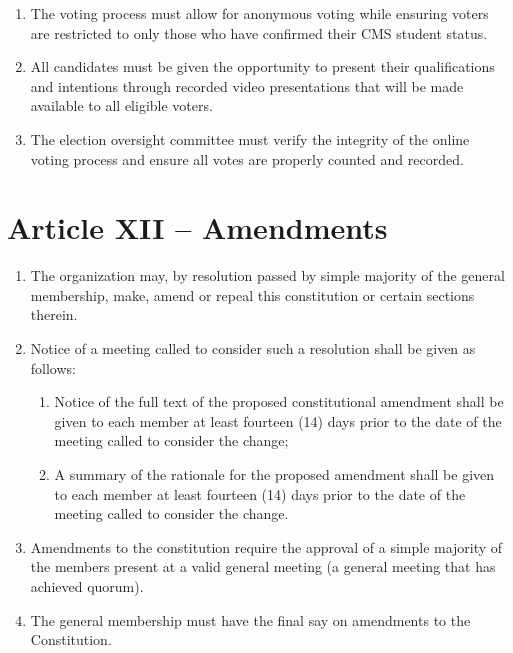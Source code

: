\documentclass[12pt,a4paper]{article}
\begin{document}
\begin{enumerate}
\begin{enumerate}
\item The voting process must allow for anonymous voting while ensuring voters are restricted to only those who have confirmed their CMS student status.

\item All candidates must be given the opportunity to present their qualifications and intentions through recorded video presentations that will be made available to all eligible voters.

\item The election oversight committee must verify the integrity of the online voting process and ensure all votes are properly counted and recorded.
\end{enumerate}
\end{enumerate}

\section*{Article XII – Amendments}

\begin{enumerate}
\item The organization may, by resolution passed by simple majority of the general membership, make, amend or repeal this constitution or certain sections therein.

\item Notice of a meeting called to consider such a resolution shall be given as follows:

\begin{enumerate}
\item Notice of the full text of the proposed constitutional amendment shall be given to each member at least fourteen (14) days prior to the date of the meeting called to consider the change;

\item A summary of the rationale for the proposed amendment shall be given to each member at least fourteen (14) days prior to the date of the meeting called to consider the change.
\end{enumerate}

\item Amendments to the constitution require the approval of a simple majority of the members present at a valid general meeting (a general meeting that has achieved quorum).

\item The general membership must have the final say on amendments to the Constitution.
\end{enumerate}
\end{document}
